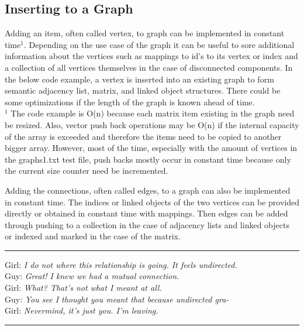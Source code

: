 \documentclass[letterpaper, 10pt]{article}
\begin{document}
\subsection{Inserting to a Graph}
Adding an item, often called vertex, to graph can be implemented in constant time\(^1\).
Depending on the use case of the graph it can be useful to sore additional information about the vertices
such as mappings to id's to its vertex or index and a collection of all vertices themselves in the case of disconnected components.
In the below code example, a vertex is inserted into an existing graph to form semantic adjacency list, matrix,
and linked object structures. There could be some optimizations if the length of the graph is known ahead of time.\\
\(^1\) The code example is O(n) because each matrix item existing in the graph need be resized.
Also, vector push back operations may be O(n) if the internal capacity of the array is exceeded and
therefore the items need to be copied to another bigger array. However, most of the time, especially 
with the amount of vertices in the graphs1.txt test file, push backs mostly occur in constant time because
only the current size counter need be incremented.

Adding the connections, often called edges, to a graph can also be implemented in constant time.
The indices or linked objects of the two vertices can be provided directly or obtained in constant time with
mappings. Then edges can be added through pushing to a collection in the case of adjacency lists and linked objects
or indexed and marked in the case of the matrix.

\vspace{.25cm}
\hrule
\vspace{.25cm}
\noindent
Girl: \textit{I do not where this relationship is going. It feels undirected.}\\
Guy: \textit{Great! I knew we had a mutual connection.}\\
Girl: \textit{What? That's not what I meant at all.}\\
Guy: \textit{You see I thought you meant that because undirected gra-}\\
Girl: \textit{Nevermind, it's just you. I'm leaving.}\\
\hrule
\vspace{1cm}
\end{document}
